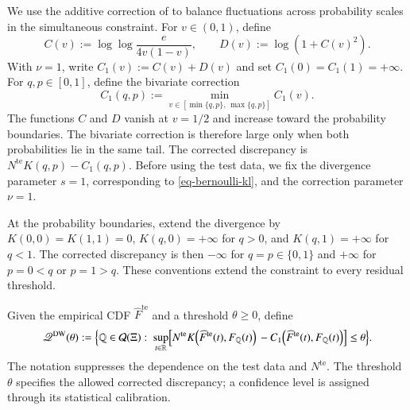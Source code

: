 \documentclass[review,11pt,3p,authoryear,nopreprintline]{elsarticle}
\begin{document}
We use the additive correction of \citet{L.J23} to balance fluctuations across probability scales in the simultaneous constraint. For $v\in(0,1)$, define
\begin{equation}
  C(v):=\log\log\frac{e}{4v(1-v)},\qquad D(v):=\log\!\left(1+C(v)^2\right).
  \label{eq-dw-correction-functions}
\end{equation}
With $\nu=1$, write $C_1(v):=C(v)+D(v)$ and set $C_1(0)=C_1(1)=+\infty$. For $q,p\in[0,1]$, define the bivariate correction
\begin{equation}
  C_1(q,p):=\min_{v\in[\min\{q,p\},\,\max\{q,p\}]}C_1(v).
  \label{eq-dw-bivariate-correction}
\end{equation}
The functions $C$ and $D$ vanish at $v=1/2$ and increase toward the probability boundaries. The bivariate correction is therefore large only when both probabilities lie in the same tail. The corrected discrepancy is $N^{\mathrm{te}}K(q,p)-C_1(q,p)$. Before using the test data, we fix the divergence parameter $s=1$, corresponding to \eqref{eq-bernoulli-kl}, and the correction parameter $\nu=1$.

At the probability boundaries, extend the divergence by $K(0,0)=K(1,1)=0$, $K(q,0)=+\infty$ for $q>0$, and $K(q,1)=+\infty$ for $q<1$. The corrected discrepancy is then $-\infty$ for $q=p\in\{0,1\}$ and $+\infty$ for $p=0<q$ or $p=1>q$. These conventions extend the constraint to every residual threshold.

\begin{definition}
  \label{definition-dw-ambiguity-set}
  Given the empirical CDF $\widehat F^{\mathrm{te}}$ and a threshold $\theta\ge0$, define
  \begin{equation} 
      \mathscr Q^{\mathrm{DW}}(\theta):=\Bigl\{\mathbb Q\in\mathcal Q(\Xi):\ 
      \sup_{t\in\mathbb R}\Bigl[ N^{\mathrm{te}}K\!\left(\widehat F^{\mathrm{te}}(t),F_{\mathbb Q}(t)\right) 
       {}-C_1\!\left(\widehat F^{\mathrm{te}}(t),F_{\mathbb Q}(t)\right)\Bigr]\le\theta\Bigr\}. 
    \label{eq-cdf-ambiguity-set}
  \end{equation}
  The notation suppresses the dependence on the test data and $N^{\mathrm{te}}$. The threshold $\theta$ specifies the allowed corrected discrepancy; a confidence level is assigned through its statistical calibration.
\end{definition}
\end{document}
